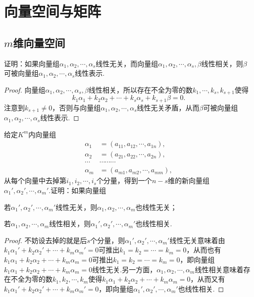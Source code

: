 \section{向量空间与矩阵}
\subsection{\texorpdfstring{$m$}{m}维向量空间}
\begin{prob}[6]
	证明：如果向量组$\alpha_1,\alpha_2,\cdots,\alpha_s$线性无关，而向量组$\alpha_1,\alpha_2,\cdots,\alpha_s,\beta$线性相关，则$\beta$可被向量组$\alpha_1,\alpha_2,\cdots,\alpha_s$线性表示.
\end{prob}
\begin{proof}
	向量组$\alpha_1,\alpha_2,\cdots,\alpha_s,\beta$线性相关，所以存在不全为零的数$k_1,\cdots,k_s,k_{s+1}$使得
	\[
		k_1\alpha_1+k_2\alpha_2+\cdots+k_s\alpha_s+k_{s+1}\beta=0.
	\]
	注意到$k_{s+1}\ne0$，否则与向量组$\alpha_1,\alpha_2,\cdots,\alpha_s$线性无关矛盾，从而$\beta$可被向量组$\alpha_1,\alpha_2,\cdots,\alpha_s$线性表示.
\end{proof}
\begin{prob}[9]
	给定$K^m$内向量组
	\begin{align*}
		\alpha_1 & =(a_{11},a_{12},\cdots,a_{1n}), \\
		\alpha_2 & =(a_{21},a_{22},\cdots,a_{2n}), \\
		\cdots   & \cdots\cdots\cdots              \\
		\alpha_m & =(a_{m1},a_{m2},\cdots,a_{mm}),
	\end{align*}
	从每个向量中去掉第$i_1,i_2,\cdots,i_s$个分量，得到一个$n-s$维的新向量组$\alpha_1',\alpha_2',\cdots,\alpha_m'$.证明：如果向量组
	\begin{mylist}
		\item 若$\alpha_1',\alpha_2',\cdots,\alpha_m'$线性无关，则$\alpha_1,\alpha_2,\cdots,\alpha_m$也线性无关；
		\item 若$\alpha_1,\alpha_2,\cdots,\alpha_m$线性相关，则$\alpha_1',\alpha_2',\cdots,\alpha_m'$也线性相关.
	\end{mylist}
\end{prob}
\begin{proof}
	不妨设去掉的就是后$s$个分量，则$\alpha_1',\alpha_2',\cdots,\alpha_m'$线性无关意味着由$k_1\alpha_1'+k_2\alpha_2'+\cdots+k_m\alpha_m'=0$可推出$k_1=k_2=\cdots=k_m=0$，从而也有$k_1\alpha_1+k_2\alpha_2+\cdots+k_m\alpha_m=0$可推出$k_1=k_2=\cdots=k_m=0$，即向量组$k_1\alpha_1+k_2\alpha_2+\cdots+k_m\alpha_m=0$线性无关.另一方面，$\alpha_1,\alpha_2,\cdots,\alpha_m$线性相关意味着存在不全为零的数$k_1,k_2,\cdots,k_m$使得$k_1\alpha_1+k_2\alpha_2+\cdots+k_m\alpha_m=0$，从而又有$k_1\alpha_1'+k_2\alpha_2'+\cdots+k_m\alpha_m'=0$，即向量组$\alpha_1',\alpha_2',\cdots,\alpha_m'$也线性相关.
\end{proof}
